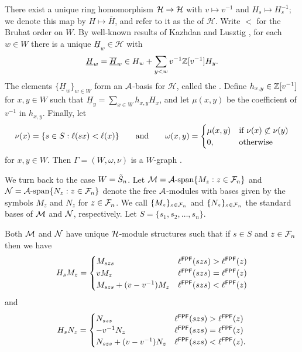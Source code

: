 \documentclass[11pt]{article}
\begin{document}
\begin{example}
There exist a unique ring homomorphism $\mathcal H\to\mathcal H$ with $v\mapsto v^{-1}$ and $H_s\mapsto H_s^{-1}$; we denote this map by $H\mapsto\overline{H}$, and refer to it as the  of $\mathcal{H}$.
Write $<$ for the Bruhat order on $W$.
By well-known results of Kazhdan and Lusztig \cite{KL},
for each $w\in W$ there is a unique $\underline H_w\in\mathcal{H}$ with
$$\underline{H}_w = \overline{\underline{H}}_w\in H_w+\sum_{y<w}v^{-1}\mathbb{Z}[v^{-1}]H_y.$$
The elements $\{\underline{H}_w\}_{w\in W}$ form an $\mathcal{A}$-basis for $\mathcal{H}$, called the .
Define $h_{x,y}\in\mathbb{Z}[v^{-1}]$ for $x,y \in W$ such that $\underline{H}_y=\sum_{x\in W}h_{x,y}H_x$,
and let $\mu(x,y)$ be the coefficient of $v^{-1}$ in $h_{x,y}$. 
Finally, let 
$$ \nu(x) = \{ s \in S : \ell(sx) < \ell(x)\}\qquad\text{and}\qquad \omega(x,y)=\begin{cases}\mu(x,y)&\text{if }\nu(x)\not\subset\nu(y)\\0,&\text{otherwise}\end{cases}$$
for $x,y \in W$.
Then $\Gamma = (W,\omega,\nu)$ is a $W$-graph \cite{KL}.
\end{example}

We turn back to the case $W=\tilde S_n$. Let $\mathcal{M} =\mathcal{A}\text{-span}\{M_z:z\in\mathcal F_n\}$ and $
\mathcal{N}=\mathcal{A}\text{-span}\{N_z:z\in\mathcal F_n\}$
denote the free $\mathcal{A}$-modules with bases given by the symbols $M_z$ and $N_z$ for $z\in\mathcal F_n$. We call $\{M_z\}_{z\in\mathcal F_n}$ and $\{N_z\}_{z\in\mathcal F_n}$ the standard bases of $\mathcal{M}$ and $\mathcal{N}$, respectively. 
Let $S = \{s_1,s_2,\dots,s_n\}$.

\begin{proposition}
Both $\mathcal{M}$ and $\mathcal{N}$ have unique $\mathcal H$-module structures such that if $s\in  S$ and $z\in\mathcal F_n$ then we have 
{\small\[H_sM_z=\begin{cases}
M_{szs}&\ell^{\mathsf{FPF}}(szs)>\ell^{\mathsf{FPF}}(z)\\
vM_{z}&\ell^{\mathsf{FPF}}(szs)=\ell^{\mathsf{FPF}}(z)\\
M_{szs}+(v-v^{-1})M_z&\ell^{\mathsf{FPF}}(szs)<\ell^{\mathsf{FPF}}(z)\end{cases}
\]}
and
{\small\[H_sN_z=\begin{cases}
N_{szs}&\ell^{\mathsf{FPF}}(szs)>\ell^{\mathsf{FPF}}(z)\\
-v^{-1}N_{z}&\ell^{\mathsf{FPF}}(szs)=\ell^{\mathsf{FPF}}(z)\\
N_{szs}+(v-v^{-1})N_z&\ell^{\mathsf{FPF}}(szs)<\ell^{\mathsf{FPF}}(z).\end{cases}
\]}
\end{proposition}
\end{document}
